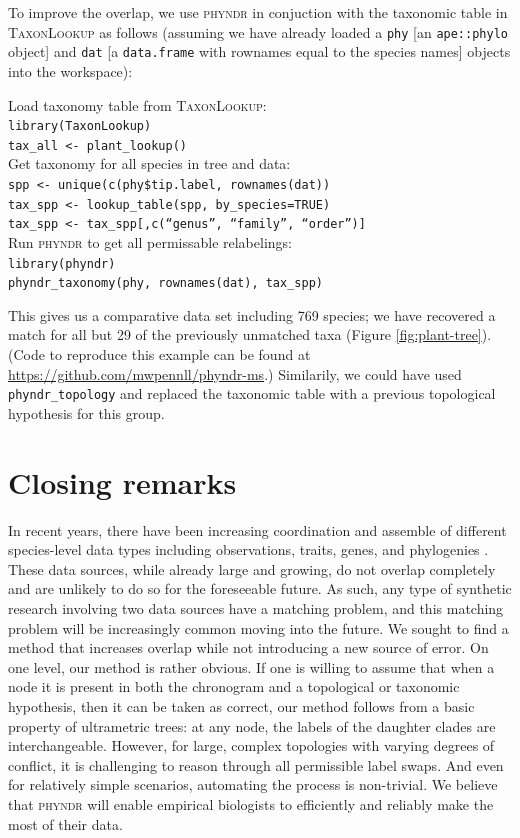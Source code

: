 \documentclass[a4paper,11pt]{article}
\begin{document}
To improve the overlap, we use \textsc{phyndr} in conjuction with the taxonomic table in \textsc{TaxonLookup} as follows (assuming we have already loaded a \texttt{phy} [an \texttt{ape::phylo} object] and \texttt{dat} [a \texttt{data.frame} with rownames equal to the species names] objects into the workspace):
\begin{flushleft}
Load taxonomy table from \textsc{TaxonLookup}:\\
\texttt{library(TaxonLookup)}\\
\texttt{tax\_all <- plant\_lookup()}\\
\bigskip
Get taxonomy for all species in tree and data:\\
\texttt{spp <- unique(c(phy\$tip.label, rownames(dat))}\\
\texttt{tax\_spp <- lookup\_table(spp, by\_species=TRUE)}\\
\texttt{tax\_spp <- tax\_spp[,c(``genus'', ``family'', ``order'')]}\\
\bigskip
Run \textsc{phyndr} to get all permissable relabelings:\\
\texttt{library(phyndr)}\\
\texttt{phyndr\_taxonomy(phy, rownames(dat), tax\_spp)}\\

\end{flushleft}
This gives us a comparative data set including 769 species; we have recovered a match for all but 29 of the previously unmatched taxa (Figure \ref{fig:plant-tree}). (Code to reproduce this example can be found at \url{https://github.com/mwpennll/phyndr-ms}.) Similarily, we could have used \texttt{phyndr\_topology} and replaced the taxonomic table with a previous topological hypothesis for this group.
 

\section{Closing remarks}

In recent years, there have been increasing coordination and assemble of different species-level data types including observations, traits, genes, and phylogenies \citep{Parr2012}.  These data sources, while already large and growing, do not overlap completely and are unlikely to do so for the foreseeable future.  As such, any type of synthetic research involving two data sources have a matching problem, and this matching problem will be increasingly common moving into the future.  We sought to find a method that increases overlap while not introducing a new source of error.  On one level, our method is rather obvious. If one is willing to assume that when a node it is present in both the chronogram and a topological or taxonomic hypothesis, then it can be taken as correct, our method follows from a basic property of ultrametric trees: at any node, the labels of the daughter clades are interchangeable. However, for large, complex topologies with varying degrees of conflict, it is challenging to reason through all permissible label swaps. And even for relatively simple scenarios, automating the process is non-trivial. We believe that \textsc{phyndr} will enable empirical biologists to efficiently and reliably make the most of their data.
\end{document}
